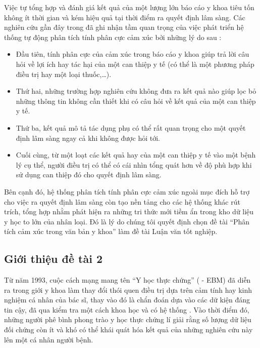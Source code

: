 Việc tự tổng hợp và đánh giá kết quả của một lượng lớn báo cáo y khoa tiêu tốn không ít thời gian và kém hiệu quả tại thời điểm ra quyết định lâm sàng. Các nghiên cứu gần đây trong \cite{medhat2014sentiment} đã ghi nhận tầm quan trọng của việc phát triển hệ thống tự động phân tích tính phân cực cảm xúc bởi những lý do sau \cite{niu2005analysis}: 
\begin{itemize}
\item Đầu tiên, tính phân cực của cảm xúc trong báo cáo y khoa giúp trả lời câu hỏi về lợi ích hay tác hại của một can thiệp y tế (có thể là một phương pháp điều trị hay một loại thuốc,\ldots).
\item Thứ hai, những trường hợp nghiên cứu không đưa ra kết quả nào giúp lọc bỏ những thông tin không cần thiết khi có câu hỏi về kết quả của một can thiệp y tế.
\item Thứ ba, kết quả \tieucuc mô tả tác dụng phụ có thể rất quan trọng cho một quyết định lâm sàng ngay cả khi không được hỏi tới.
\item Cuối cùng, từ một loạt các kết quả \tichcuc hay \tieucuc của một can thiệp y tế vào một bệnh lý cụ thể, người điều trị có thể có cái nhìn tổng quát hơn về độ phù hợp khi sử dụng can thiệp đó cho quyết định lâm sàng.
\end{itemize}

Bên cạnh đó, hệ thống phân tích tính phân cực cảm xúc ngoài mục đích hỗ trợ cho việc ra quyết định lâm sàng còn tạo nền tảng cho các hệ thống khác rút trích, tổng hợp nhằm phát hiện ra những tri thức mới tiềm ẩn trong kho dữ liệu y học to lớn của nhân loại. Đó là lý do chúng tôi quyết định chọn đề tài ``Phân tích cảm xúc trong văn bản y khoa'' làm đề tài Luận văn tốt nghiệp.

\subsection{Giới thiệu đề tài 2}
Từ năm 1993, cuộc cách mạng mang tên ``Y học thực chứng'' ( - EBM) đã diễn ra trong giới y khoa làm thay đổi thói quen điều trị dựa trên cảm tính hay kinh nghiệm cá nhân của bác sĩ, thay vào đó là chẩn đoán dựa vào các dữ kiện đáng tin cậy, đã qua kiểm tra một cách khoa học và có hệ thống \cite{Nguyen2004}. Vào thời điểm đó, những người phê bình phong trào y học thực chứng lí giải rằng số lượng dữ liệu đối chứng còn ít và khó có thể khái quát hóa kết quả của những nghiên cứu này lên một cá nhân người bệnh.\\


